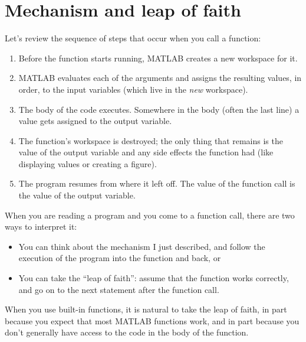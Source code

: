 \documentclass[
]{book}
\begin{document}
\section{Mechanism and leap of faith}

Let's review the sequence of steps that occur when you call
a function:

\begin{enumerate}

\item Before the function starts running, MATLAB creates a new
workspace for it.

\item MATLAB evaluates each of the arguments and assigns
the resulting values, in order, to the input variables (which
live in the {\em new} workspace).

\item The body of the code executes.  Somewhere in the body
(often the last line) a value gets assigned to the output variable.

\item The function's workspace is destroyed; the only thing
that remains is the value of the output variable and any side
effects the function had (like displaying values or creating
a figure).

\item The program resumes from where it left off.  The value
of the function call is the value of the output variable.

\end{enumerate}

When you are reading a program and you come to a function call,
there are two ways to interpret it:

\begin{itemize}

\item You can think about the mechanism I just described,
and follow the execution of the program into the function and back, or

\item You can take the ``leap of faith'': assume that the function
works correctly, and go on to the next statement after the
function call.

\end{itemize}

When you use built-in functions, it is natural to take the leap
of faith, in part because you expect that most
MATLAB functions work, and in part because you don't
generally have access to the code in the body of the function.
\end{document}
